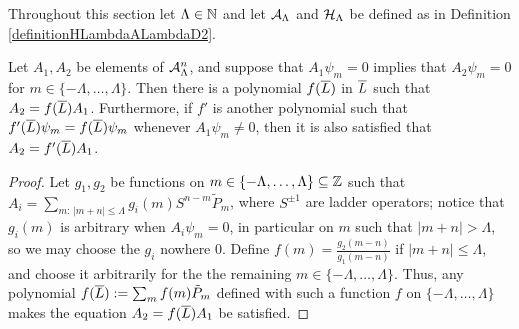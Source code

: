         
        
        
        



Throughout this section let $\Lambda \in \mathbb{N}$ and let $\mathcal A_\Lambda$ and $\mathcal H_\Lambda$ be defined as in Definition \ref{definitionHLambdaALambdaD2}.

\begin{lemma}\label{lemmaExistsPolynomialInLTakingSameGradeToItD2}
Let $A_1, A_2$ be elements of $\mathcal A_\Lambda^n$, and suppose that $A_1 \psi_m = 0$ implies that $A_2\psi_m = 0$ for $m \in \{-\Lambda, \dots, \Lambda\}$.
Then there is a polynomial $f(\overline{L})$ in $\overline{L}$ such that $A_2 = f(\overline{L}) A_1$. Furthermore, if $f'$ is another polynomial such that $f'(\overline{L})\psi_m = f(\overline{L})\psi_m$ whenever $A_1 \psi_m \neq 0$, then it is also satisfied that $A_2 = f'(\overline{L}) A_1$.
\end{lemma}
\begin{proof}
Let $g_1, g_2$ be functions on $m \in \{-\Lambda, \dots, \Lambda\}\subseteq \mathbb{Z}$ such that $A_i = \sum_{m: \, |m+n| \leq \Lambda} g_i(m) S^{n-m} \tilde P_m$, where $S^{\pm 1}$ are ladder operators; notice that $g_i(m)$ is arbitrary when $A_i \psi_m = 0$, in particular on $m$ such that $|m+n| > \Lambda$, so we may choose the $g_i$ nowhere $0$. Define $f(m) = \frac{g_2(m-n)}{g_1(m-n)}$ if $|m+n| \leq \Lambda$, and choose it arbitrarily for the the remaining $m \in \{-\Lambda, \dots, \Lambda\}$. Thus, any polynomial $f(\overline{L}) := \sum_{m} f(m) \tilde P_m$ defined with such a function $f$ on $\{-\Lambda, \dots, \Lambda\}$ makes the equation $A_2 = f(\overline{L}) A_1$ be satisfied.
\end{proof}

